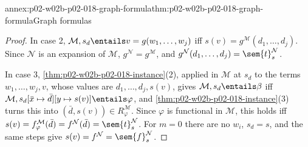 \begin{annexitem}{annex:p02-w02b-p02-018-graph-formula}{thm:p02-w02b-p02-018-graph-formula}{Graph formulas}
\begin{proof}
In case 2, \(\mathcal M,s_d\entails v=g(w_1,\ldots,w_j)\) iff
\(s(v)=g^{\mathcal M}(d_1,\ldots,d_j)\).  Since \(\mathcal N\) is an expansion
of \(\mathcal M\), \(g^{\mathcal N}=g^{\mathcal M}\), and
\(g^{\mathcal N}(d_1,\ldots,d_j)=\sem{t}^{\mathcal N}_s\).

In case 3, \cref{thm:p02-w02b-p02-018-instance}(2), applied in
\(\mathcal M\) at \(s_d\) to the terms \(w_1,\ldots,w_j,v\), whose values
are \(d_1,\ldots,d_j,s(v)\), gives \(\mathcal M,s_d\entails\beta\) iff
\(\mathcal M,s_d[\bar x\mapsto\bar d][y\mapsto s(v)]\entails\varphi\), and
\cref{thm:p02-w02b-p02-018-instance}(3) turns this into
\((\bar d,s(v))\in R^{\mathcal M}_{\varphi}\).  Since \(\varphi\) is
functional in \(\mathcal M\), this holds iff
\(s(v)=f^{\mathcal M}_{\varphi}(\bar d)=f^{\mathcal N}(\bar d)
=\sem{t}^{\mathcal N}_s\).  For \(m=0\) there are no \(w_i\), \(s_d=s\), and
the same steps give \(s(v)=f^{\mathcal N}=\sem{f}^{\mathcal N}_s\).
\end{proof}
\end{annexitem}

